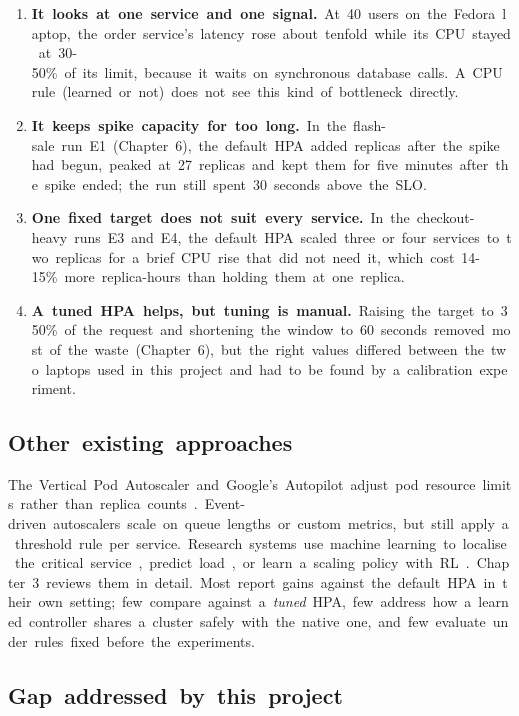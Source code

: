 \documentclass[12pt,a4paper,oneside]{report}
\begin{document}
\begin{enumerate}\setlength{\itemsep}{1pt}
  \item \textbf{It~looks~at~one~service~and~one~signal.}~At~40~users~on~the~Fedora~laptop,~the~order~service's~latency~rose~about~tenfold~while~its~CPU~stayed~at~30-50\%~of~its~limit,~because~it~waits~on~synchronous~database~calls.~A~CPU~rule~(learned~or~not)~does~not~see~this~kind~of~bottleneck~directly.
  \item \textbf{It~keeps~spike~capacity~for~too~long.}~In~the~flash-sale~run~E1~(Chapter~6),~the~default~HPA~added~replicas~after~the~spike~had~begun,~peaked~at~27~replicas~and~kept~them~for~five~minutes~after~the~spike~ended;~the~run~still~spent~30~seconds~above~the~SLO.
  \item \textbf{One~fixed~target~does~not~suit~every~service.}~In~the~checkout-heavy~runs~E3~and~E4,~the~default~HPA~scaled~three~or~four~services~to~two~replicas~for~a~brief~CPU~rise~that~did~not~need~it,~which~cost~14-15\%~more~replica-hours~than~holding~them~at~one~replica.
  \item \textbf{A~tuned~HPA~helps,~but~tuning~is~manual.}~Raising~the~target~to~350\%~of~the~request~and~shortening~the~window~to~60~seconds~removed~most~of~the~waste~(Chapter~6),~but~the~right~values~differed~between~the~two~laptops~used~in~this~project~and~had~to~be~found~by~a~calibration~experiment.
\end{enumerate}

\subsection{Other~existing~approaches}

The~Vertical~Pod~Autoscaler~and~Google's~Autopilot~adjust~pod~resource~limits~rather~than~replica~counts~\cite{autopilot}.~Event-driven~autoscalers~scale~on~queue~lengths~or~custom~metrics,~but~still~apply~a~threshold~rule~per~service.~Research~systems~use~machine~learning~to~localise~the~critical~service~\cite{firm,sinan},~predict~load~\cite{smarthpa,adaptscale},~or~learn~a~scaling~policy~with~RL~\cite{gwydion,pandey,rossi}.~Chapter~3~reviews~them~in~detail.~Most~report~gains~against~the~default~HPA~in~their~own~setting;~few~compare~against~a~\textit{tuned}~HPA,~few~address~how~a~learned~controller~shares~a~cluster~safely~with~the~native~one,~and~few~evaluate~under~rules~fixed~before~the~experiments.


\subsection{Gap~addressed~by~this~project}
\end{document}
